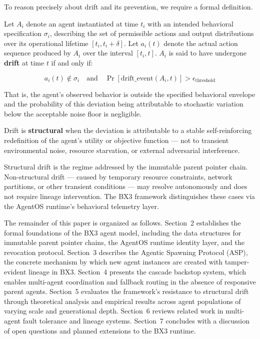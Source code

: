 To reason precisely about drift and its prevention, we require a formal definition.

\begin{definition}
Let $A_i$ denote an agent instantiated at time $t_i$ with an intended behavioral specification $\sigma_i$, describing the set of permissible actions and output distributions over its operational lifetime $[t_i, t_i + \delta]$. Let $a_i(t)$ denote the actual action sequence produced by $A_i$ over the interval $[t_i, t]$. $A_i$ is said to have undergone \textbf{drift} at time $t$ if and only if:

\[
a_i(t) \notin \sigma_i \quad \text{and} \quad \Pr[\text{drift\_event}(A_i, t)] > \epsilon_{\text{threshold}}
\]

That is, the agent's observed behavior is outside the specified behavioral envelope and the probability of this deviation being attributable to stochastic variation below the acceptable noise floor is negligible.

Drift is \textbf{structural} when the deviation is attributable to a stable self-reinforcing redefinition of the agent's utility or objective function — not to transient environmental noise, resource starvation, or external adversarial interference.
\end{definition}

Structural drift is the regime addressed by the immutable parent pointer chain. Non-structural drift — caused by temporary resource constraints, network partitions, or other transient conditions — may resolve autonomously and does not require lineage intervention. The BX3 framework distinguishes these cases via the AgentOS runtime's behavioral telemetry layer.


The remainder of this paper is organized as follows. Section~2 establishes the formal foundations of the BX3 agent model, including the data structures for immutable parent pointer chains, the AgentOS runtime identity layer, and the revocation protocol. Section~3 describes the Agentic Spawning Protocol (ASP), the concrete mechanism by which new agent instances are created with tamper-evident lineage in BX3. Section~4 presents the cascade backstop system, which enables multi-agent coordination and fallback routing in the absence of responsive parent agents. Section~5 evaluates the framework's resistance to structural drift through theoretical analysis and empirical results across agent populations of varying scale and generational depth. Section~6 reviews related work in multi-agent fault tolerance and lineage systems. Section~7 concludes with a discussion of open questions and planned extensions to the BX3 runtime.
